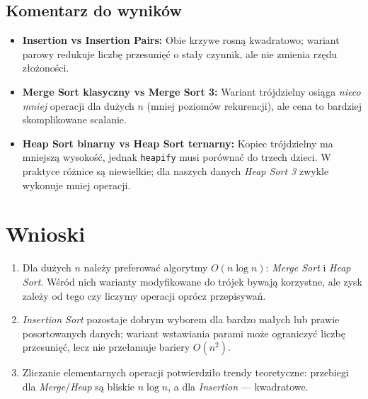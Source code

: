 \documentclass[11pt,a4paper]{article}
\begin{document}
\subsection{Komentarz do wyników}
\begin{itemize}
  \item \textbf{Insertion vs Insertion Pairs:} Obie krzywe rosną kwadratowo; wariant parowy redukuje liczbę przesunięć o stały czynnik, ale nie zmienia rzędu złożoności.
  \item \textbf{Merge Sort klasyczny vs Merge Sort 3:} Wariant trójdzielny osiąga \emph{nieco mniej} operacji dla dużych $n$ (mniej poziomów rekurencji), ale cena to bardziej skomplikowane scalanie.
  \item \textbf{Heap Sort binarny vs Heap Sort ternarny:} Kopiec trójdzielny ma mniejszą wysokość, jednak \texttt{heapify} musi porównać do trzech dzieci. W praktyce różnice są niewielkie; dla naszych danych \emph{Heap Sort 3} zwykle wykonuje mniej operacji.
\end{itemize}

\section{Wnioski}
\begin{enumerate}
  \item Dla dużych $n$ należy preferować algorytmy $O(n\log n)$: \emph{Merge Sort} i \emph{Heap Sort}. Wśród nich warianty modyfikowane do trójek bywają korzystne, ale zysk zależy od tego czy liczymy operacji oprócz przepisywań.
  \item \emph{Insertion Sort} pozostaje dobrym wyborem dla bardzo małych lub prawie posortowanych danych; wariant wstawiania parami może ograniczyć liczbę przesunięć, lecz nie przełamuje bariery $O(n^2)$.
  \item Zliczanie elementarnych operacji potwierdziło trendy teoretyczne: przebiegi dla \emph{Merge}/\emph{Heap} są bliskie $n\log n$, a dla \emph{Insertion} — kwadratowe.
\end{enumerate}
\end{document}

